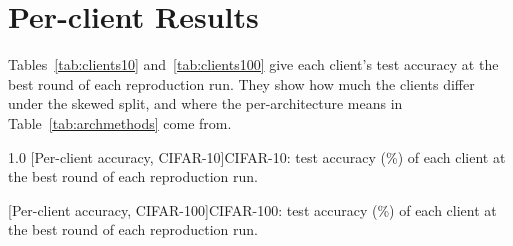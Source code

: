 \chapter{Per-client Results}
\label{app:clients}

Tables~\ref{tab:clients10} and~\ref{tab:clients100} give each client's test accuracy at the best round of each reproduction run. They show how much the clients differ under the skewed split, and where the per-architecture means in Table~\ref{tab:archmethods} come from.

\vspace{0.8em}
\noindent\begin{minipage}{\textwidth}
\begin{spacing}{1.0}\centering
{}[Per-client accuracy, CIFAR-10]{CIFAR-10: test accuracy (\%) of each client at the best round of each reproduction run.}
\label{tab:clients10}
\footnotesize
\renewcommand{\arraystretch}{0.9}
\TabClientsTen

\vspace{1.0em}
[Per-client accuracy, CIFAR-100]{CIFAR-100: test accuracy (\%) of each client at the best round of each reproduction run.}
\label{tab:clients100}
\TabClientsHundred
\end{spacing}
\end{minipage}

